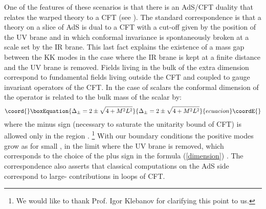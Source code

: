 \documentclass[a4paper,12pt,dvips]{article}
\begin{document}
One of the features of these scenarios is that there is an AdS/CFT
duality that relates the \coordHE{} warped theory to a \coordHE{} CFT (see
\cite{arkani}). The standard correspondence is that a theory on a
slice of AdS\coordHE{} is dual to a \coordHE{} CFT with a cut-off given by the
position of the UV brane and in which conformal invariance is
spontaneously broken at a scale set by the IR brane. This last
fact explains the existence of a mass gap between the KK modes in
the case where the IR brane is kept at a finite distance and the
UV brane is removed. Fields living in the bulk of the extra
dimension correspond to fundamental \coordHE{} fields living outside the
CFT and coupled to gauge invariant operators of the CFT. In the
case of scalars  the conformal dimension of the operator is
related to the bulk mass of the scalar by:
\begin{equation}\coord{}\boxEquation{
\Delta_\pm=2\pm \sqrt{4+M^2 L^2} \label{dimension}
}{
\Delta_\pm=2\pm \sqrt{4+M^2 L^2} }{ecuacion}\coordE{}\end{equation}
where the minus sign (necessary to saturate the unitarity bound
\coordHE{} of \coordHE{} CFT) is allowed only in the region
\coordHE{}. \footnote{We would like to thank Prof. Igor
Klebanov for clarifying this point to us.} With our boundary
conditions the positive modes grow as \coordHE{} for small
\coordHE{}, in the limit where the UV brane is removed, which corresponds
to the choice of the plus sign in the formula (\ref{dimension})
\cite{klebanov}.  The correspondence also asserts that classical
computations on the AdS side correspond to large-\coordHE{} contributions
in loops of CFT.
\end{document}
